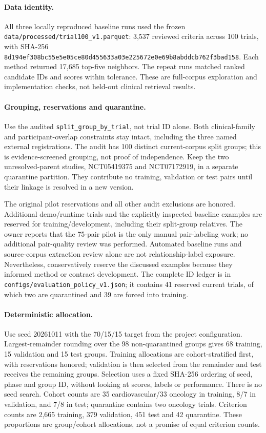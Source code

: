 \documentclass[10pt,letterpaper]{article}
\newcommand{\pathcode}[1]{\nolinkurl{#1}}
\begin{document}
\paragraph{Data identity.}
All three locally reproduced baseline runs used the frozen
\pathcode{data/processed/trial100_v1.parquet}: 3,537 reviewed criteria across
100 trials, with SHA-256
\pathcode{8d194ef308bc55e5e05ce80d455633a03e225672e0e69b8abddcb762f3bad158}.
Each method returned 17,685 top-five neighbors. The repeat runs matched ranked
candidate IDs and scores within tolerance. These are full-corpus exploration
and implementation checks, not held-out clinical retrieval results.

\paragraph{Grouping, reservations and quarantine.}
Use the audited \pathcode{split_group_by_trial}, not trial ID alone. Both
clinical-family and participant-overlap constraints stay intact, including the
three named external registrations. The audit has 100 distinct current-corpus
split groups; this is evidence-screened grouping, not proof of independence.
Keep the two unresolved-parent studies, NCT05419375 and NCT07172919, in a
separate quarantine partition. They contribute no training, validation or test
pairs until their linkage is resolved in a new version.

The original pilot reservations and all other audit exclusions are honored.
Additional demo/runtime trials and the explicitly inspected baseline examples
are reserved for training/development, including their split-group relatives.
The owner reports that the 75-pair pilot is the only manual pair-labeling work;
no additional pair-quality review was performed. Automated baseline runs and
source-corpus extraction review alone are not relationship-label exposure.
Nevertheless, conservatively reserve the discussed examples because they
informed method or contract development. The complete ID ledger is in
\pathcode{configs/evaluation_policy_v1.json}; it contains 41 reserved current
trials, of which two are quarantined and 39 are forced into training.

\paragraph{Deterministic allocation.}
Use seed 20261011 with the 70/15/15 target from the project configuration.
Largest-remainder rounding over the 98 non-quarantined groups gives 68 training,
15 validation and 15 test groups. Training allocations are cohort-stratified
first, with reservations honored; validation is then selected from the remainder
and test receives the remaining groups. Selection uses a fixed SHA-256 ordering
of seed, phase and group ID, without looking at scores, labels or performance.
There is no seed search. Cohort counts are 35 cardiovascular/33 oncology in
training, 8/7 in validation, and 7/8 in test; quarantine contains two oncology trials.
Criterion counts are 2,665 training, 379 validation, 451 test and 42 quarantine.
These proportions are group/cohort allocations, not a promise of equal criterion counts.
\end{document}
